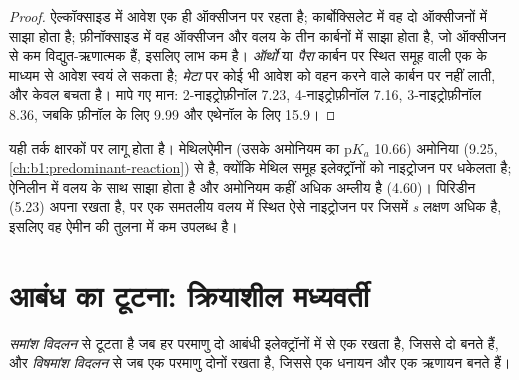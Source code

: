 \begin{proof}
ऐल्कॉक्साइड में आवेश एक ही ऑक्सीजन पर रहता है; कार्बोक्सिलेट में वह
दो ऑक्सीजनों में साझा होता है; फ़ीनॉक्साइड में वह ऑक्सीजन और वलय के तीन
कार्बनों में साझा होता है, जो ऑक्सीजन से कम विद्युत-ऋणात्मक हैं, इसलिए लाभ कम है।
\textit{ऑर्थो} या \textit{पैरा} कार्बन पर स्थित  समूह
 वाली एक  के माध्यम से आवेश स्वयं ले सकता है;
\textit{मेटा} पर कोई भी  आवेश को  वहन करने वाले कार्बन पर
नहीं लाती, और केवल  बचता है। मापे गए
मान: 2-नाइट्रोफ़ीनॉल 7.23, 4-नाइट्रोफ़ीनॉल 7.16, 3-नाइट्रोफ़ीनॉल 8.36,
जबकि फ़ीनॉल के लिए 9.99 और एथेनॉल के लिए 15.9।
\end{proof}

यही तर्क क्षारकों पर लागू होता है। मेथिलऐमीन (उसके
अमोनियम का $\mathrm{p}K_a$ 10.66) अमोनिया (9.25, \cref{ch:b1:predominant-reaction}) से  है,
क्योंकि मेथिल समूह इलेक्ट्रॉनों को नाइट्रोजन पर धकेलता है; ऐनिलीन में 
वलय के साथ साझा होता है और अमोनियम कहीं अधिक अम्लीय है (4.60)।
पिरिडीन (5.23) अपना  रखता है, पर एक समतलीय वलय में स्थित ऐसे नाइट्रोजन पर
जिसमें \textit{s} लक्षण अधिक है, इसलिए वह ऐमीन की तुलना में कम उपलब्ध है।

\section{आबंध का टूटना: क्रियाशील मध्यवर्ती}

\begin{definition}[समांश और विषमांश विदलन]\label{def:b1:electronic-effects:cleavage}
 \emph{समांश विदलन} से टूटता है जब हर परमाणु
दो आबंधी इलेक्ट्रॉनों में से एक रखता है, जिससे दो  बनते हैं, और
\emph{विषमांश विदलन} से जब एक परमाणु दोनों रखता है, जिससे एक
धनायन और एक ऋणायन बनते हैं।
\end{definition}

